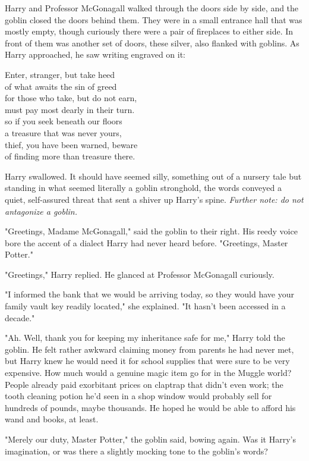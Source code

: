 Harry and Professor McGonagall walked through the doors
side by side, and the goblin closed the doors behind them. They
were in a small entrance hall that was mostly empty,
though curiously there were a pair of fireplaces to either
side. In front of them was another set of doors, these
silver, also flanked with goblins. As Harry approached, he
saw writing engraved on it:

\begin{inscription}
Enter, stranger, but take heed\\
of what awaits the sin of greed\\
for those who take, but do not earn,\\
must pay most dearly in their turn.\\
so if you seek beneath our floors\\
a treasure that was never yours,\\
thief, you have been warned, beware\\
of finding more than treasure there.
\end{inscription}

Harry swallowed. It should have seemed silly, something
out of a nursery tale{\el} but standing in what seemed
literally a goblin stronghold, the words conveyed a quiet,
self-assured threat that sent a shiver up Harry's spine.
\emph{Further note: do not antagonize a goblin.}

"Greetings, Madame McGonagall," said the goblin to their
right. His reedy voice bore the accent of a dialect
Harry had never heard before. "Greetings, Master Potter."

"Greetings," Harry replied. He glanced at Professor McGonagall curiously.

"I informed the bank that we would be arriving today, so
they would have your family vault key readily located," she
explained. "It hasn't been accessed in a decade."

"Ah. Well, thank you for keeping my inheritance safe for
me," Harry told the goblin. He felt rather awkward claiming
money from parents he had never met, but Harry knew he
would need it for school supplies that were sure to be
very expensive. How much would a genuine magic item go
for in the Muggle world? People already paid exorbitant
prices on claptrap that didn't even work; the tooth cleaning
potion he'd seen in a shop window would probably sell for
hundreds of pounds, maybe thousands. He hoped he
would be able to afford his wand and books, at least.

"Merely our duty, Master Potter," the goblin said,
bowing again. Was it Harry's imagination, or was there a
slightly mocking tone to the goblin's words?

